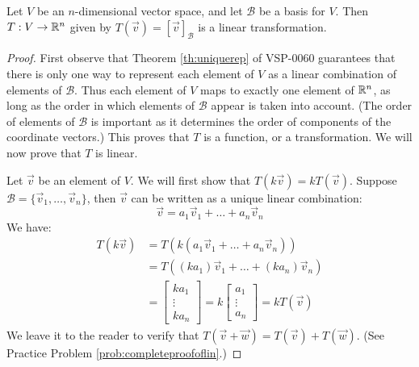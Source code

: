 \documentclass{ximera}
\begin{document}
\begin{theorem}\label{th:coordvectmappinglinear}
Let $V$ be an $n$-dimensional vector space, and let $\mathcal{B}$ be a basis for $V$.  Then  $T:V\rightarrow \mathbb{R}^n$ given by $T(\vec{v})=[\vec{v}]_{\mathcal{B}}$ is a linear transformation.
\end{theorem}
\begin{proof}
First observe that Theorem \ref{th:uniquerep} of VSP-0060 guarantees that there is only one way to represent each element of $V$ as a linear combination of elements of $\mathcal{B}$.  Thus each element of $V$ maps to exactly one element of $\mathbb{R}^n$, as long as the order in which elements of $\mathcal{B}$ appear is taken into account.  (The order of elements of $\mathcal{B}$ is important as it determines the order of components of the coordinate vectors.)  This proves that $T$ is a function, or a transformation.  We will now prove that $T$ is linear.

Let $\vec{v}$ be an element of $V$.  We will first show that $T(k\vec{v})=kT(\vec{v})$.  Suppose $\mathcal{B}=\{\vec{v}_1, \ldots ,\vec{v}_n\}$, then $\vec{v}$ can be written as a unique linear combination:
$$\vec{v}=a_1\vec{v}_1+ \ldots +a_n\vec{v}_n$$
We have:
\begin{align*}
    T(k\vec{v})&=T(k(a_1\vec{v}_1+ \ldots +a_n\vec{v}_n))\\
    &=T((ka_1)\vec{v}_1+ \ldots +(ka_n)\vec{v}_n)\\
    &=\begin{bmatrix}ka_1\\\vdots\\ka_n\end{bmatrix}=k\begin{bmatrix}a_1\\\vdots\\a_n\end{bmatrix}=kT(\vec{v})
\end{align*}
We leave it to the reader to verify that $T(\vec{v}+\vec{w})=T(\vec{v})+T(\vec{w})$.  (See Practice Problem \ref{prob:completeproofoflin}.)
\end{proof}

\end{document}

